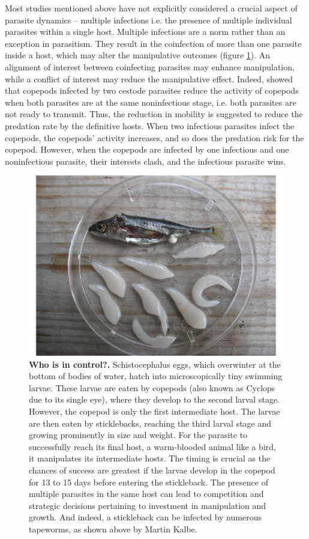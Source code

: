 \documentclass[a4paper]{scrartcl}
\begin{document}
Most studies mentioned above have not explicitly considered a crucial aspect of parasite dynamics -- multiple infections \citep{kalbe:JFB:2002} i.e. the presence of multiple individual parasites within a single host.
Multiple infections are a norm rather than an exception in parasitism. 
They result in the coinfection of more than one parasite inside a host, which may alter the manipulative outcomes (figure \ref{fig:empirical}). 
An alignment of interest between coinfecting parasites may enhance manipulation, while a conflict of interest may reduce the manipulative effect. 
Indeed, \cite{Hafer:2015gl} showed that copepods infected by two cestode parasites reduce the activity of copepods when both parasites are at the same noninfectious stage, i.e. both parasites are not ready to transmit. 
Thus, the reduction in mobility is suggested to reduce the predation rate by the definitive hosts. 
When two infectious parasites infect the copepods, the copepods' activity increases, and so does the predation risk for the copepod. 
However, when the copepods are infected by one infectious and one noninfectious parasite, their interests clash, and the infectious parasite wins. 

\begin{figure}[ht!]
\captionsetup{format=plain}
\centering
\includegraphics[width=0.75\columnwidth]{Figures/Sept_10.pdf}
\caption{\textbf{Who is in control?.}
Schistocephalus eggs, which overwinter at the bottom of bodies of water, hatch into microscopically tiny swimming larvae. 
These larvae are eaten by copepods (also known as Cyclops due to its single eye), where they develop to the second larval stage. 
However, the copepod is only the first intermediate host. 
The larvae are then eaten by sticklebacks, reaching the third larval stage and growing prominently in size and weight. 
For the parasite to successfully reach its final host, a warm-blooded animal like a bird, it manipulates its intermediate hosts. 
The timing is crucial as the chances of success are greatest if the larvae develop in the copepod for 13 to 15 days before entering the stickleback. 
The presence of multiple parasites in the same host can lead to competition and strategic decisions pertaining to investment in manipulation and growth.
And indeed, a stickleback can be infected by numerous tapeworms, as shown above by Martin Kalbe.
}
\label{fig:empirical}
\end{figure}
\end{document}
